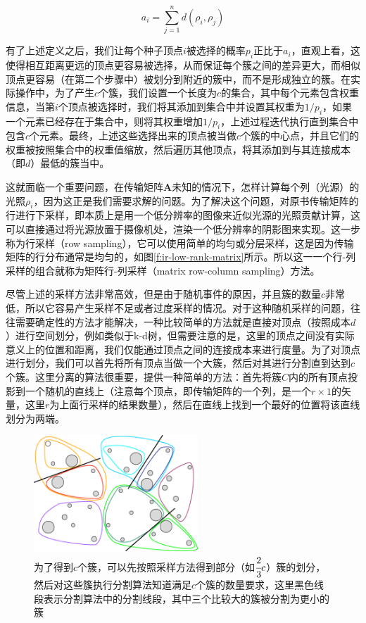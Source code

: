 \begin{equation}
	a_i=\sum^{n}_{j=1}d(\rho_i,\rho_j)
\end{equation}

\noindent 有了上述定义之后，我们让每个种子顶点$i$被选择的概率$p_i$正比于$a_i$，直观上看，这使得相互距离更远的顶点更容易被选择，从而保证每个簇之间的差异更大，而相似顶点更容易（在第二个步骤中）被划分到附近的簇中，而不是形成独立的簇。在实际操作中，为了产生$c$个簇，我们设置一个长度为$c$的集合，其中每个元素包含权重信息，当第$i$个顶点被选择时，我们将其添加到集合中并设置其权重为$1/p_i$，如果一个元素已经存在于集合中，则将其权重增加$1/p_i$，上述过程迭代执行直到集合中包含$c$个元素。最终，上述这些选择出来的顶点被当做$c$个簇的中心点，并且它们的权重被按照集合中的权重值缩放，然后遍历其他顶点，将其添加到与其连接成本（即$d$）最低的簇当中。

这就面临一个重要问题，在传输矩阵$\mathbf{A}$未知的情况下，怎样计算每个列（光源）的光照$\rho_i$，因为这正是我们需要求解的问题。为了解决这个问题，\cite{a:MatrixRow-ColumnSamplingfortheMany-LightProblem}对原书传输矩阵的行进行下采样，即本质上是用一个低分辨率的图像来近似光源的光照贡献计算，这可以直接通过将光源放置于摄像机处，渲染一个低分辨率的阴影图来实现。这一步称为行采样（row sampling），它可以使用简单的均匀或分层采样，这是因为传输矩阵的行分布通常是均匀的，如图\ref{f:ir-low-rank-matrix}所示。所以这一一个行-列采样的组合就称为矩阵行-列采样（matrix row-column sampling）方法。

尽管上述的采样方法非常高效，但是由于随机事件的原因，并且簇的数量$c$非常低，所以它容易产生采样不足或者过度采样的情况。对于这种随机采样的问题，往往需要确定性的方法才能解决，一种比较简单的方法就是直接对顶点（按照成本$d$）进行空间划分，例如类似于k-d树，但需要注意的是，这里的顶点之间没有实际意义上的位置和距离，我们仅能通过顶点之间的连接成本来进行度量。为了对顶点进行划分，我们可以首先将所有顶点当做一个大簇，然后对其进行分割直到达到$c$个簇。这里分离的算法很重要，\cite{a:MatrixRow-ColumnSamplingfortheMany-LightProblem}提供一种简单的方法：首先将簇$C$内的所有顶点投影到一个随机的直线上（注意每个顶点，即传输矩阵的一个列，是一个$r\times 1$的矢量，这里$r$为上面行采样的结果数量），然后在直线上找到一个最好的位置将该直线划分为两端。

\begin{figure}
	\sidecaption
	\includegraphics[width=0.55\textwidth]{figures/ir/combine-clustering}
	\caption{为了得到$c$个簇，可以先按照采样方法得到部分（如$ \cfrac{2}{3}c$）簇的划分，然后对这些簇执行分割算法知道满足$c$个簇的数量要求，这里黑色线段表示分割算法中的分割线段，其中三个比较大的簇被分割为更小的簇}
	\label{f:ir-combine-clustering}
\end{figure}

